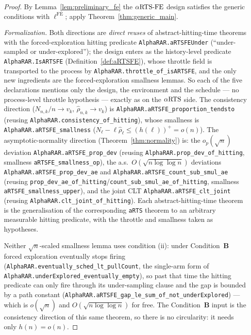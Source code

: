 \begin{proof}
By Lemma~\ref{lem:preliminary_fe} the $\alpha\text{RTS-FE}$ design satisfies the generic
conditions with $\ell^{\mathrm{FE}}$; apply Theorem~\ref{thm:generic_main}.

\emph{Formalization.} Both directions are \emph{direct reuses} of abstract-hitting-time theorems
with the forced-exploration hitting predicate \texttt{AlphaRAR.aRTSFEUnder}
(``under-sampled or under-explored''); the design enters as the history-level predicate
\texttt{AlphaRAR.IsARTSFE} (Definition~\ref{def:aRTSFE}), whose throttle field is transported to
the process by \texttt{AlphaRAR.throttle\_of\_isARTSFE}, and the only new ingredients are the
forced-exploration smallness lemmas. So each of the five declarations mentions only the design, the
environment and the schedule --- no process-level throttle hypothesis --- exactly as on the
$\alpha\text{RTS}$ side. The consistency direction
($N_{n,k}/n\to v_k$, $\hat\rho_{n,k}\to v_k$) is \texttt{AlphaRAR.aRTSFE\_proportion\_tendsto}
(reusing \texttt{AlphaRAR.consistency\_of\_hitting}), whose smallness is
\texttt{AlphaRAR.aRTSFE\_smallness} ($N_\ell-\ell\hat\rho_\ell\le(h(\ell))^+=o(n)$). The
asymptotic-normality direction (Theorem~\ref{thm:normality}) is: the $o_p(\sqrt n)$ deviation
\texttt{AlphaRAR.aRTSFE\_prop\_dev} (reusing \texttt{AlphaRAR.prop\_dev\_of\_hitting}, smallness
\texttt{aRTSFE\_smallness\_op}), the a.s.\ $O(\sqrt{n\log\log n})$ deviations
\texttt{AlphaRAR.aRTSFE\_prop\_dev\_ae} and \texttt{AlphaRAR.aRTSFE\_count\_sub\_smul\_ae} (reusing
\texttt{prop\_dev\_ae\_of\_hitting}/\texttt{count\_sub\_smul\_ae\_of\_hitting}, smallness
\texttt{aRTSFE\_smallness\_upper}), and the joint CLT \texttt{AlphaRAR.aRTSFE\_clt\_joint} (reusing
\texttt{AlphaRAR.clt\_joint\_of\_hitting}). Each abstract-hitting-time theorem is the generalisation
of the corresponding \texttt{aRTS} theorem to an arbitrary measurable hitting predicate, with the
throttle and smallness taken as hypotheses.

Neither $\sqrt n$-scaled smallness lemma uses condition (ii): under Condition~\textbf{B} forced
exploration eventually stops firing (\texttt{AlphaRAR.eventually\_sched\_lt\_pullCount}, the single-arm
form of \texttt{AlphaRAR.underExplored\_eventually\_empty}), so past that time the hitting predicate
can only fire through its under-sampling clause and the gap is bounded by a path constant
(\texttt{AlphaRAR.aRTSFE\_gap\_le\_sum\_of\_not\_underExplored}) --- which is $o(\sqrt n)$ and
$O(\sqrt{n\log\log n})$ for free. The Condition~\textbf{B} input is the consistency direction of
this same theorem, so there is no circularity: it needs only $h(n)=o(n)$.
\end{proof}

